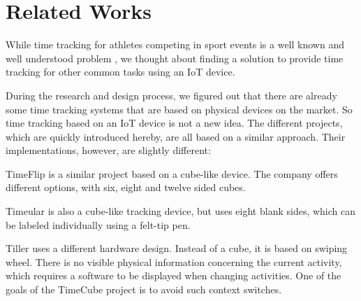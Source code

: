 \section{Related Works}

While time tracking for athletes competing in sport events is a well known and well understood problem \cite{real-time-tracker}, we thought about finding a solution to provide time tracking for other common tasks using an IoT device.

During the research and design process, we figured out that there are already some time tracking systems that are based on physical devices on the market. So time tracking based on an IoT device is not a new idea. The different projects, which are quickly introduced hereby, are all based on a similar approach. Their implementations, however, are slightly different:

TimeFlip is a similar project \cite{timeflip} based on a cube-like device. The company offers different options, with six, eight and twelve sided cubes.

Timeular \cite{timeular} is also a cube-like tracking device, but uses eight blank sides, which can be labeled individually using a felt-tip pen.

Tiller \cite{tiller} uses a different hardware design. Instead of a cube, it is based on swiping wheel. There is no visible physical information concerning the current activity, which requires a software to be displayed when changing activities. One of the goals of the TimeCube project is to avoid such context switches.
